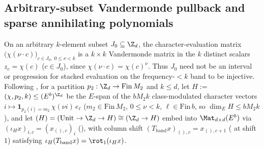 \subsection{Arbitrary-subset Vandermonde pullback and sparse annihilating polynomials}\label{sec:sumsets-poly}

On an arbitrary $k$-element subset $J_0 \subseteq \Z_d$, the character-evaluation matrix
$\bigl(\chi(\nu \cdot c)\bigr)_{c \in J_0,\; 0 \le \nu < k}$ is a $k \times k$ Vandermonde matrix in
the $k$ distinct scalars $z_c = \chi(c)$ ($c \in J_0$), since $\chi(\nu \cdot c) = \chi(c)^\nu$.
Thus $J_0$ need not be an interval or progression for stacked evaluation on the frequency-$< k$ band
to be injective. Following \cite[Section~6]{SharedDecoders2026}, for a partition
$p_2 : \Z_d \to \mathrm{Fin}\,M_2$ and $k \le d$, let $H := {}$
$(\chi, p_2, k) \le (E^b)^{\Z_d}$ be the $E$-span of the $b M_2 k$ class-modulated character vectors
$i \mapsto \mathbf{1}_{p_2(i) = m_2}\,\chi(\nu i)\,e_\ell$ ($m_2 \in \mathrm{Fin}\,M_2$,
$0 \le \nu < k$, $\ell \in \mathrm{Fin}\,b$, so $\dim_E H \le b M_2 k$), and let
$(H) = (\mathrm{Unit} \to \Z_d \to H) \cong (\Z_d \to H)$
embed into $\Mat_{d\times d}(E^b)$ via $(\iota_H x)_{i, c} = (x_{(), c})_i$
(), with column shift $(T_{\mathrm{band}} x)_{(), c} =
x_{(), c+1}$ ( at shift~$1$) satisfying
$\iota_H(T_{\mathrm{band}} x) = \rot_1(\iota_H x)$.

